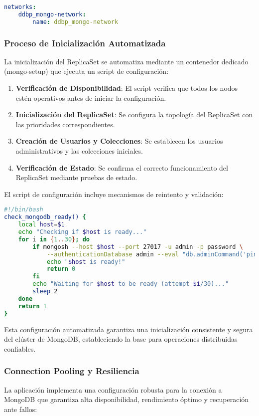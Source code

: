 \documentclass[12pt,letterpaper]{article}
\begin{document}
\begin{lstlisting}[language=yaml]
networks:
    ddbp_mongo-network:
        name: ddbp_mongo-network
\end{lstlisting}

\subsubsection{Proceso de Inicialización Automatizada}
La inicialización del ReplicaSet se automatiza mediante un contenedor dedicado (mongo-setup) que ejecuta un script de configuración:

\begin{enumerate}
    \item \textbf{Verificación de Disponibilidad}: El script verifica que todos los nodos estén operativos antes de iniciar la configuración.
    \item \textbf{Inicialización del ReplicaSet}: Se configura la topología del ReplicaSet con las prioridades correspondientes.
    \item \textbf{Creación de Usuarios y Colecciones}: Se establecen los usuarios administrativos y las colecciones iniciales.
    \item \textbf{Verificación de Estado}: Se confirma el correcto funcionamiento del ReplicaSet mediante pruebas de estado.
\end{enumerate}

El script de configuración incluye mecanismos de reintento y validación:

\begin{lstlisting}[language=bash]
#!/bin/bash
check_mongodb_ready() {
    local host=$1
    echo "Checking if $host is ready..."
    for i in {1..30}; do
        if mongosh --host $host --port 27017 -u admin -p password \
            --authenticationDatabase admin --eval "db.adminCommand('ping')" &>/dev/null; then
            echo "$host is ready!"
            return 0
        fi
        echo "Waiting for $host to be ready (attempt $i/30)..."
        sleep 2
    done
    return 1
}
\end{lstlisting}

Esta configuración automatizada garantiza una inicialización consistente y segura del clúster de MongoDB, estableciendo la base para operaciones distribuidas confiables.

\subsubsection{Connection Pooling y Resiliencia}
La aplicación implementa una configuración robusta para la conexión a MongoDB que garantiza alta disponibilidad, rendimiento óptimo y recuperación ante fallos:
\end{document}
